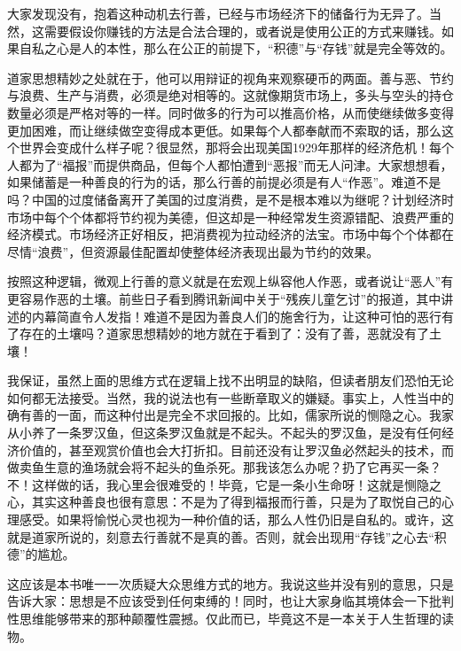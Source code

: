 大家发现没有，抱着这种动机去行善，已经与市场经济下的储备行为无异了。当然，这需要假设你赚钱的方法是合法合理的，或者说是使用公正的方式来赚钱。如果自私之心是人的本性，那么在公正的前提下，“积德”与“存钱”就是完全等效的。

道家思想精妙之处就在于，他可以用辩证的视角来观察硬币的两面。善与恶、节约与浪费、生产与消费，必须是绝对相等的。这就像期货市场上，多头与空头的持仓数量必须是严格对等的一样。同时做多的行为可以推高价格，从而使继续做多变得更加困难，而让继续做空变得成本更低。如果每个人都奉献而不索取的话，那么这个世界会变成什么样子呢？很显然，那将会出现美国1929年那样的经济危机！每个人都为了“福报”而提供商品，但每个人都怕遭到“恶报”而无人问津。大家想想看，如果储蓄是一种善良的行为的话，那么行善的前提必须是有人“作恶”。难道不是吗？中国的过度储备离开了美国的过度消费，是不是根本难以为继呢？计划经济时市场中每个个体都将节约视为美德，但这却是一种经常发生资源错配、浪费严重的经济模式。市场经济正好相反，把消费视为拉动经济的法宝。市场中每个个体都在尽情“浪费”，但资源最佳配置却使整体经济表现出最为节约的效果。

按照这种逻辑，微观上行善的意义就是在宏观上纵容他人作恶，或者说让“恶人”有更容易作恶的土壤。前些日子看到腾讯新闻中关于“残疾儿童乞讨”的报道，其中讲述的内幕简直令人发指！难道不是因为善良人们的施舍行为，让这种可怕的恶行有了存在的土壤吗？道家思想精妙的地方就在于看到了：没有了善，恶就没有了土壤！

我保证，虽然上面的思维方式在逻辑上找不出明显的缺陷，但读者朋友们恐怕无论如何都无法接受。当然，我的说法也有一些断章取义的嫌疑。事实上，人性当中的确有善的一面，而这种付出是完全不求回报的。比如，儒家所说的恻隐之心。我家从小养了一条罗汉鱼，但这条罗汉鱼就是不起头。不起头的罗汉鱼，是没有任何经济价值的，甚至观赏价值也会大打折扣。目前还没有让罗汉鱼必然起头的技术，而做卖鱼生意的渔场就会将不起头的鱼杀死。那我该怎么办呢？扔了它再买一条？不！这样做的话，我心里会很难受的！毕竟，它是一条小生命呀！这就是恻隐之心，其实这种善良也很有意思：不是为了得到福报而行善，只是为了取悦自己的心理感受。如果将愉悦心灵也视为一种价值的话，那么人性仍旧是自私的。或许，这就是道家所说的，刻意去行善就不是真的善。否则，就会出现用“存钱”之心去“积德”的尴尬。

这应该是本书唯一一次质疑大众思维方式的地方。我说这些并没有别的意思，只是告诉大家：思想是不应该受到任何束缚的！同时，也让大家身临其境体会一下批判性思维能够带来的那种颠覆性震撼。仅此而已，毕竟这不是一本关于人生哲理的读物。

\clearpage
